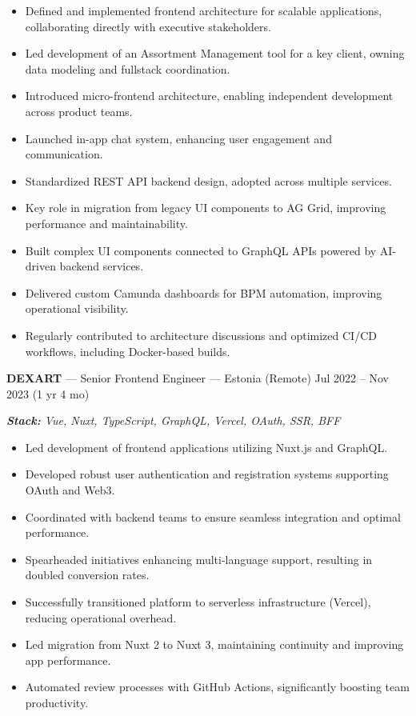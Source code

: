 \documentclass[a4paper,9pt]{article}
\begin{document}
\begin{itemize}[leftmargin=*]
  \item Defined and implemented frontend architecture for scalable applications, collaborating directly with executive stakeholders.
  \item Led development of an Assortment Management tool for a key client, owning data modeling and fullstack coordination.
  \item Introduced micro-frontend architecture, enabling independent development across product teams.
  \item Launched in-app chat system, enhancing user engagement and communication.
  \item Standardized REST API backend design, adopted across multiple services.
  \item Key role in migration from legacy UI components to AG Grid, improving performance and maintainability.
  \item Built complex UI components connected to GraphQL APIs powered by AI-driven backend services.
  \item Delivered custom Camunda dashboards for BPM automation, improving operational visibility.
  \item Regularly contributed to architecture discussions and optimized CI/CD workflows, including Docker-based builds.
\end{itemize}
\vspace{6pt}

\textbf{DEXART} --- Senior Frontend Engineer --- Estonia (Remote) \hfill Jul 2022 -- Nov 2023 (1 yr 4 mo)

\textit{\textbf{Stack:} Vue, Nuxt, TypeScript, GraphQL, Vercel, OAuth, SSR, BFF}
\begin{itemize}[leftmargin=*]
  \item Led development of frontend applications utilizing Nuxt.js and GraphQL.
  \item Developed robust user authentication and registration systems supporting OAuth and Web3.
  \item Coordinated with backend teams to ensure seamless integration and optimal performance.
  \item Spearheaded initiatives enhancing multi-language support, resulting in doubled conversion rates.
  \item Successfully transitioned platform to serverless infrastructure (Vercel), reducing operational overhead.
  \item Led migration from Nuxt 2 to Nuxt 3, maintaining continuity and improving app performance.
  \item Automated review processes with GitHub Actions, significantly boosting team productivity.
\end{itemize}
\vspace{6pt}
\end{document}
